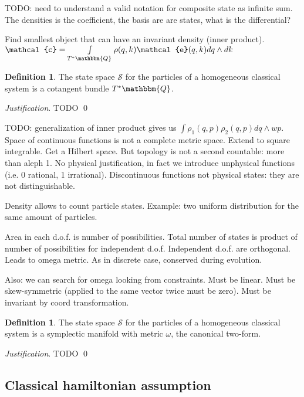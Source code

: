 \documentclass[aps,pra,10pt,twocolumn,floatfix,nofootinbib]{revtex4-1}
\theoremstyle{definition}
\newtheorem{defn}[prop]{Definition}
\newenvironment{justification}{\emph{Justification}.}{\qed}
\begin{document}
TODO: need to understand a valid notation for composite state as infinite sum. The densities is the coefficient, the basis are are states, what is the differential?

Find smallest object that can have an invariant density (inner product). $\mathcal{c}= \int\limits_{T^*\mathbbm{Q}} \rho(q,k) \mathcal{e}(q,k)dq\wedge dk$

\begin{defn}\label{classical_phase_space}
The state space $\mathcal{S}$ for the particles of a homogeneous classical  system is a cotangent bundle $T^*\mathbbm{Q}$.
\end{defn}

\begin{justification}
	TODO
\end{justification}

TODO: generalization of inner product gives us $\int \rho_1(q, p) \rho_2(q, p) dq\wedge wp$. Space of continuous functions is not a complete metric space. Extend to square integrable. Get a Hilbert space. But topology is not a second countable: more than aleph 1. No physical justification, in fact we introduce unphysical functions (i.e. 0 rational, 1 irrational). Discontinuous functions not physical states: they are not distinguishable.

Density allows to count particle states. Example: two uniform distribution for the same amount of particles.

Area in each d.o.f. is number of possibilities. Total number of states is product of number of possibilities for independent d.o.f. Independent d.o.f. are orthogonal. Leads to omega metric. As in discrete case, conserved during evolution.

Also: we can search for omega looking from constraints. Must be linear. Must be skew-symmetric (applied to the same vector twice must be zero). Must be invariant by coord transformation. 

\begin{defn}\label{symplectic_manifold}
	The state space $\mathcal{S}$ for the particles of a homogeneous classical  system is a symplectic manifold with metric $\omega$, the canonical two-form.
\end{defn}

\begin{justification}
	TODO
\end{justification}

\subsection{Classical hamiltonian assumption}
\end{document}
